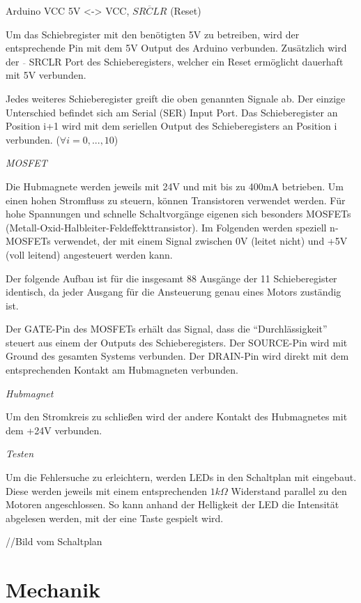 Arduino VCC 5V <-> VCC, $\overline{SRCLR}$ (Reset)

Um das Schiebregister mit den benötigten 5V zu betreiben, wird der entsprechende Pin mit dem 5V Output des Arduino verbunden.
Zusätzlich wird der $\overline{ }$ SRCLR Port des Schieberegisters, welcher ein Reset ermöglicht dauerhaft mit 5V verbunden.

Jedes weiteres Schieberegister greift die oben genannten Signale ab.
Der einzige Unterschied befindet sich am Serial (SER) Input Port.
Das Schieberegister an Position i+1 wird mit dem seriellen Output des Schieberegisters an Position i verbunden. ($\forall i = 0,...,10$)

\textit{MOSFET}

Die Hubmagnete werden jeweils mit 24V und mit bis zu 400mA betrieben.
Um einen hohen Stromfluss zu steuern, können Transistoren verwendet werden.
Für hohe Spannungen und schnelle Schaltvorgänge eigenen sich besonders MOSFETs (Metall-Oxid-Halbleiter-Feldeffekttransistor).
Im Folgenden werden speziell n-MOSFETs verwendet, der mit einem Signal zwischen 0V (leitet nicht) und +5V (voll leitend) angesteuert werden kann.

Der folgende Aufbau ist für die insgesamt 88 Ausgänge der 11 Schieberegister identisch, da jeder Ausgang für die Ansteuerung genau eines Motors zuständig ist.

Der GATE-Pin des MOSFETs erhält das Signal, dass die ``Durchlässigkeit'' steuert aus einem der Outputs des Schieberegisters.
Der SOURCE-Pin wird mit Ground des gesamten Systems verbunden.
Der DRAIN-Pin wird direkt mit dem entsprechenden Kontakt am Hubmagneten verbunden.

\textit{Hubmagnet}

Um den Stromkreis zu schließen wird der andere Kontakt des Hubmagnetes mit dem +24V verbunden.

\textit{Testen}

Um die Fehlersuche zu erleichtern, werden LEDs in den Schaltplan mit eingebaut.
Diese werden jeweils mit einem entsprechenden $1k\Omega$ Widerstand parallel zu den Motoren angeschlossen.
So kann anhand der Helligkeit der LED die Intensität abgelesen werden, mit der eine Taste gespielt wird.

//Bild vom Schaltplan

\section{Mechanik}\label{vorgehenHW}

